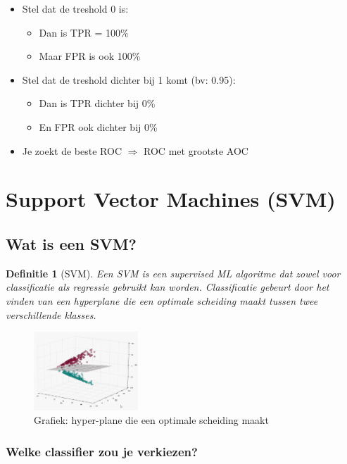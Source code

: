 \documentclass{article}
\newtheorem{theorem}{Definitie}[section]
\begin{document}
\begin{itemize}
    \item Stel dat de treshold 0 is:
    \begin{itemize}
        \item Dan is TPR = 100\%
        \item Maar FPR is ook 100\%
    \end{itemize}
    \item Stel dat de treshold dichter bij 1 komt (bv: 0.95):
    \begin{itemize}
        \item Dan is TPR dichter bij 0\%
        \item En FPR ook dichter bij 0\%
    \end{itemize}
    \item Je zoekt de beste ROC $\Rightarrow$ ROC met grootste AOC
\end{itemize}

\section{Support Vector Machines (SVM)}

\subsection{Wat is een SVM?}

\begin{theorem}[SVM]
Een SVM is een supervised ML algoritme dat zowel voor classificatie als regressie
gebruikt kan worden. Classificatie gebeurt door het vinden van een hyperplane die
een optimale scheiding maakt tussen twee verschillende klasses.
\end{theorem}

\begin{figure}[H]
    \centering
    \includegraphics[width=0.35\textwidth]{svm.png}
    \caption{Grafiek: hyper-plane die een optimale scheiding maakt}
\end{figure}

\subsubsection{Welke classifier zou je verkiezen?}
\end{document}
